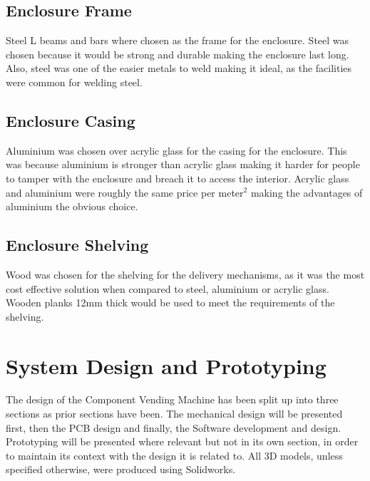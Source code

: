 \documentclass[a4paper,11pt]{article}
\numberwithin{figure}{section}
\numberwithin{table}{section}
\begin{document}
\subsection{Enclosure Frame}
Steel L beams and bars where chosen as the frame for the enclosure. Steel was chosen because it would be strong and durable making the enclosure last long. Also, steel was one of the easier metals to weld making it ideal, as the facilities were common for welding steel.

\subsection{Enclosure Casing}
Aluminium was chosen over acrylic glass for the casing for the enclosure. This was because aluminium is stronger than acrylic glass making it harder for people to tamper with the enclosure and breach it to access the interior. Acrylic glass and aluminium were roughly the same price per meter$^2$ making the advantages of aluminium the obvious choice.  

\subsection{Enclosure Shelving}
Wood was chosen for the shelving for the delivery mechanisms, as it was the most cost effective solution when compared to steel, aluminium or acrylic glass. Wooden planks 12mm thick would be used to meet the requirements of the shelving.

\newpage
\section{System Design and Prototyping}\thispagestyle{sectionstart}
The design of the Component Vending Machine has been split up into three sections as prior sections have been. The mechanical design will be presented first, then the PCB design and finally, the Software development and design. Prototyping will be presented where relevant but not in its own section, in order to maintain its context with the design it is related to. All 3D models, unless specified otherwise, were produced using Solidworks.
\end{document}
